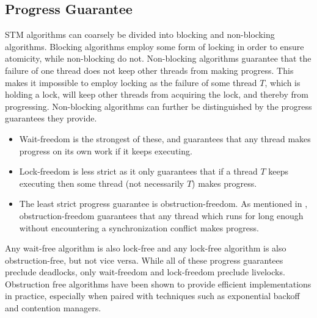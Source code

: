 \subsection{Progress Guarantee}
\ac{STM} algorithms can coarsely be divided into blocking and non-blocking algorithms\cite[p. 47]{harris2010transactional}. Blocking algorithms employ some form of locking in order to ensure atomicity, while non-blocking do not\cite[p. 59]{herlihy2012art}. Non-blocking algorithms guarantee that the failure of one thread does not keep other threads from making progress\cite[p. 47]{harris2010transactional}\cite[p. 142]{herlihy1991wait}\cite[p. 59]{herlihy2012art}. This  makes it impossible to employ locking as the failure of some thread $T$, which is holding a lock, will keep other threads from acquiring the lock, and thereby from progressing. Non-blocking algorithms can further be distinguished by the progress guarantees they provide. 
\begin{itemize}
	\item Wait-freedom is the strongest of these, and guarantees that any thread makes progress on its own work if it keeps executing\cite[p. 124]{herlihy1991wait}\cite[p. 59]{herlihy2012art}. 
	\item Lock-freedom is less strict as it only guarantees that if a thread $T$ keeps executing then some thread (not necessarily $T$) makes progress\cite[p. 47]{harris2010transactional}\cite[p. 60]{herlihy2012art}. 
	\item The least strict progress guarantee is obstruction-freedom\cite[p. 47]{harris2010transactional}\cite{herlihy2003obstruction}\cite[p. 61]{herlihy2012art}. As mentioned in , obstruction-freedom guarantees that any thread which runs for long enough without encountering a synchronization conflict makes progress\cite[p. 1]{herlihy2003obstruction}. 
\end{itemize}
Any wait-free algorithm is also lock-free and any lock-free algorithm is also obstruction-free, but not vice versa\cite[p. 60]{herlihy2012art}. While all of these progress guarantees preclude deadlocks, only wait-freedom and lock-freedom preclude livelocks\cite[p. 47]{harris2010transactional}. Obstruction free algorithms have been shown to provide efficient implementations in practice\cite[p. 61]{herlihy2012art}, especially when paired with techniques such as exponential backoff\cite[p. 147]{herlihy2012art} and contention managers\cite[p. 51]{harris2010transactional}.

